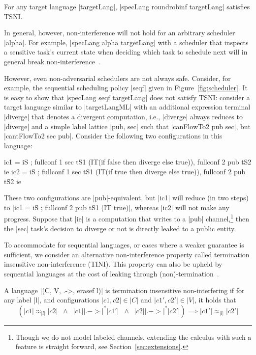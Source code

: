 \begin{theorem}
  \label{thm:rr-tsni}
For any target language |targetLang|, |specLang roundrobinf
targetLang| satisfies TSNI.
\end{theorem}

In general, however, non-interference will not hold for an arbitrary scheduler |alpha|.
%
For example, |specLang alpha targetLang| with a scheduler that inspects a
sensitive task's current state when deciding which task to schedule next
will in general break non-interference~\cite{russo2006securing,BartheRRS07}.
%
%

However, even non-adversarial schedulers are not always safe.
Consider, for example, the sequential scheduling policy |seqf| given in
Figure~\ref{fig:scheduler}.
%
It is easy to show that |specLang seqf targetLang| does not satisfy
TSNI:
%
consider a target language similar to |targetLangML| with an
additional expression terminal |diverge| that denotes a divergent computation,
i.e., |diverge| always reduces to |diverge| and a simple label lattice |{pub,
sec}| such that |canFlowTo2 pub sec|, but |cantFlowTo2 sec pub|.
Consider the following two configurations in this language:
\begin{code}
ic1 = iS ; fullconf 1 sec tS1 (IT(if false then diverge else true)),  fullconf 2 pub tS2 ie
ic2 = iS ; fullconf 1 sec tS1 (IT(if true then diverge else true)),   fullconf 2 pub tS2 ie
\end{code}
These two configurations are |pub|-equivalent, but |ic1| will reduce 
(in two steps) 
to |ic1 = iS ; fullconf 2 pub tS1 (IT true)|, whereas |ic2| will not make
any progress.
%
Suppose that |ie| is a computation that writes to a |pub| channel,\footnote{
Though we do not model labeled channels, extending the calculus with such a
feature is straight forward, see Section~\ref{sec:extensions}.}
then the |sec| task's decision to diverge or not is directly leaked to a
public entity.

%
To accommodate for sequential languages, or cases where a weaker guarantee
is sufficient, we consider an alternative non-interference property called termination insensitive
non-interference (TINI).  This property can also be upheld by sequential languages at the cost
of leaking through (non)-termination~\cite{Askarov:2008}.
%
\begin{definition}
  A language |(C, V, .->, erasef l)| is termination
  insensitive non-interfering if for any label |l|, and configurations
  $|c1, c2|\in|C|$ and $|c1', c2'|\in|V|$, it holds that
  \[
    (|c1| \approx_{|l|} |c2|
    \;\;\land\;\;
    |c1| |.->|^* |c1'|
    \;\;\land\;\;
    |c2| |.->|^* |c2'|)
    \implies
    |c1'| \approx_{|l|} |c2'|
  \]
\end{definition}

